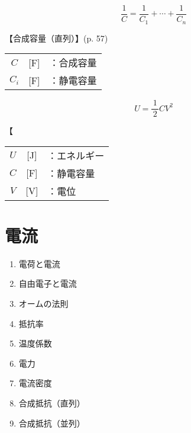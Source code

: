 \documentclass[10pt]{jarticle}
\begin{document}
\newpage
\[
\frac{1}{C} = \frac{1}{C_1} + \cdots + \frac{1}{C_n}
\]


\vskip3mm
\noindent
【合成容量（直列）】{\footnotesize (p. 57)}

\begin{tabular}{ccl}
$C$	&[F]	&：合成容量 \\
$C_i$	&[F]	&：静電容量 \\
\end{tabular}



\newpage
\[
U = \frac{1}{\, 2 \,} C V^2
\]


\vskip3mm
\noindent
【

\begin{tabular}{ccl}
$U$	&[J]	&：エネルギー \\
$C$	&[F]	&：静電容量 \\
$V$	&[V]	&：電位
\end{tabular}






\newpage
\addtocounter{page}{-1}
\thispagestyle{empty}
\section{電流}

\begin{enumerate}
\setcounter{enumi}{\thepage}
\small
\itemsep-4mm
\item 電荷と電流 \\
\item 自由電子と電流 \\
\item オームの法則 \\
\item 抵抗率 \\
\item 温度係数 \\
\item 電力 \\
\item 電流密度 \\
\item 合成抵抗（直列） \\
\item 合成抵抗（並列） \\
\end{enumerate}
\end{document}
